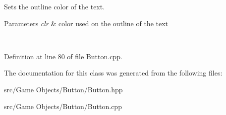 Sets the outline color of the text. 


\begin{DoxyParams}{Parameters}
{\em clr} & color used on the outline of the text \begin{DoxyVerb}\end{DoxyVerb}
 \\
\hline
\end{DoxyParams}


Definition at line 80 of file Button.\+cpp.


\begin{DoxyCode}{0}

\end{DoxyCode}


The documentation for this class was generated from the following files\+:\begin{DoxyCompactItemize}
\item 
src/\+Game Objects/\+Button/Button.\+hpp\item 
src/\+Game Objects/\+Button/Button.\+cpp\end{DoxyCompactItemize}
